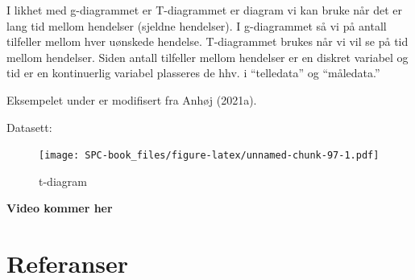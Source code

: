 \documentclass[
]{book}
\begin{document}
I likhet med g-diagrammet er T-diagrammet er diagram vi kan bruke når det er lang tid mellom hendelser (sjeldne hendelser). I g-diagrammet så vi på antall tilfeller mellom hver uønskede hendelse. T-diagrammet brukes når vi vil se på tid mellom hendelser. Siden antall tilfeller mellom hendelser er en diskret variabel og tid er en kontinuerlig variabel plasseres de hhv. i ``telledata'' og ``måledata.''

Eksempelet under er modifisert fra Anhøj (2021a).

Datasett:

\begin{figure}
\centering
\texttt{[image: SPC-book\_files/figure-latex/unnamed-chunk-97-1.pdf]}
\caption{\label{fig:unnamed-chunk-97}t-diagram}
\end{figure}

\textbf{Video kommer her}

\hypertarget{referanser}{%
\chapter*{Referanser}\label{referanser}}
\end{document}
